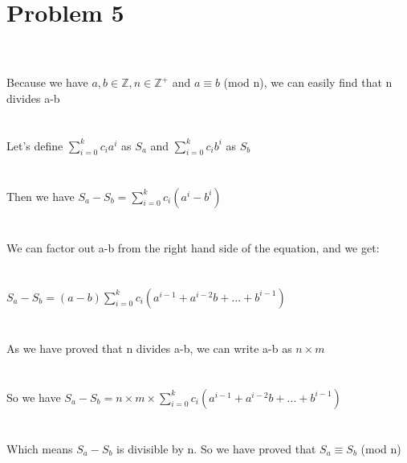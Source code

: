 \documentclass{article}
\begin{document}
\section{Problem 5}
\\ \hspace*{\fill} \\
Because we have $a,b \in \mathbb{Z}, n \in \mathbb{Z}^+$ and $a \equiv b $ (mod n), we can easily find that n divides a-b\\
\\ \hspace*{\fill} \\
Let's define $\sum_{i=0}^{k} c_i a^i $ as $S_a$ and $\sum_{i=0}^{k} c_i b^i $ as $S_b$\\
\\ \hspace*{\fill} \\
Then we have $S_a-S_b = \sum_{i=0}^{k} c_i (a^i-b^i) $\\
\\ \hspace*{\fill} \\
We can factor out a-b from the right hand side of the equation, and we get:\\
\\ \hspace*{\fill} \\
$S_a-S_b = (a-b) \sum_{i=0}^{k} c_i (a^{i-1}+a^{i-2}b+...+b^{i-1})$\\
\\ \hspace*{\fill} \\
As we have proved that n divides a-b, we can write a-b as $n \times m$\\
\\ \hspace*{\fill} \\
So we have $S_a-S_b = n \times m \times \sum_{i=0}^{k} c_i (a^{i-1}+a^{i-2}b+...+b^{i-1})$\\
\\ \hspace*{\fill} \\
Which means $S_a-S_b$ is divisible by n. So we have proved that $S_a \equiv S_b$ (mod n)\\
\\ \hspace*{\fill} \\
\end{document}
